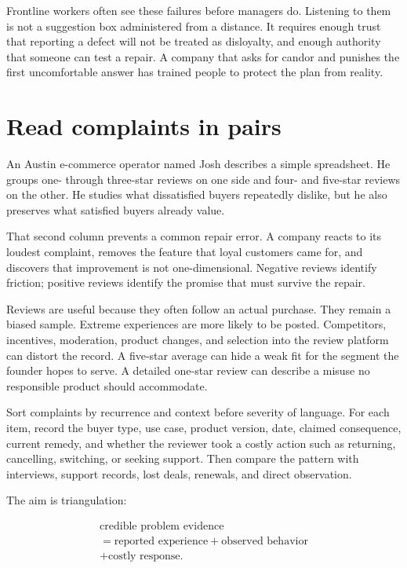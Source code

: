 Frontline workers often see these failures before managers do. Listening to
them is not a suggestion box administered from a distance. It requires enough
trust that reporting a defect will not be treated as disloyalty, and enough
authority that someone can test a repair. A company that asks for candor and
punishes the first uncomfortable answer has trained people to protect the plan
from reality.

\section{Read complaints in pairs}

An Austin e-commerce operator named Josh describes a simple spreadsheet. He
groups one- through three-star reviews on one side and four- and five-star
reviews on the other. He studies what dissatisfied buyers repeatedly dislike,
but he also preserves what satisfied buyers already value.

That second column prevents a common repair error. A company reacts to its
loudest complaint, removes the feature that loyal customers came for, and
discovers that improvement is not one-dimensional. Negative reviews identify
friction; positive reviews identify the promise that must survive the repair.

Reviews are useful because they often follow an actual purchase. They remain a
biased sample. Extreme experiences are more likely to be posted. Competitors,
incentives, moderation, product changes, and selection into the review platform
can distort the record. A five-star average can hide a weak fit for the segment
the founder hopes to serve. A detailed one-star review can describe a misuse no
responsible product should accommodate.

Sort complaints by recurrence and context before severity of language. For
each item, record the buyer type, use case, product version, date, claimed
consequence, current remedy, and whether the reviewer took a costly action such
as returning, cancelling, switching, or seeking support. Then compare the
pattern with interviews, support records, lost deals, renewals, and direct
observation.

The aim is triangulation:

\begin{equation}
\begin{gathered}
\text{credible problem evidence}\\
=\text{reported experience}+\text{observed behavior}\\
+\text{costly response}.
\end{gathered}
\end{equation}

